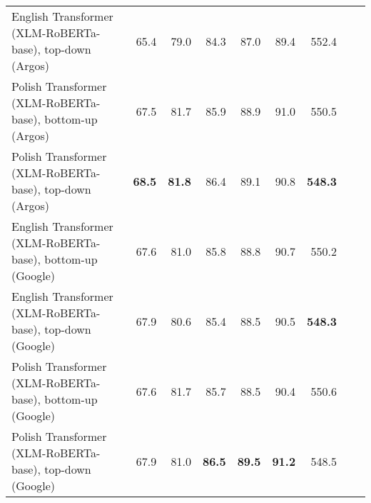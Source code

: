\begin{table}[ht!]
{\begin{tabular}{lrrrrrrrr}
  English Transformer (XLM-RoBERTa-base), top-down (Argos) & 65.4 & 79.0 & 84.3 & 87.0 & 89.4 & 552.4 \\ 
  Polish Transformer (XLM-RoBERTa-base), bottom-up (Argos) & 67.5 & 81.7 & 85.9 & 88.9 & 91.0 & 550.5 \\ 
  Polish Transformer (XLM-RoBERTa-base), top-down (Argos) & \textbf{68.5} & \textbf{81.8} & 86.4 & 89.1 & 90.8 & \textbf{548.3} \\ 
  English Transformer (XLM-RoBERTa-base), bottom-up (Google) & 67.6 & 81.0 & 85.8 & 88.8 & 90.7 & 550.2 \\ 
  English Transformer (XLM-RoBERTa-base), top-down (Google) & 67.9 & 80.6 & 85.4 & 88.5 & 90.5 & \textbf{548.3} \\ 
  Polish Transformer (XLM-RoBERTa-base), bottom-up (Google) & 67.6 & 81.7 & 85.7 & 88.5 & 90.4 & 550.6 \\ 
  Polish Transformer (XLM-RoBERTa-base), top-down (Google) & 67.9 & 81.0 & \textbf{86.5} & \textbf{89.5} & \textbf{91.2} & 548.5 \\ 
   \hline
\end{tabular}
}
\end{table}





